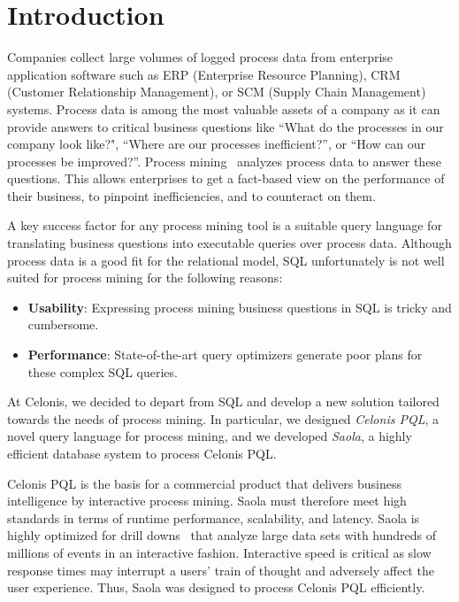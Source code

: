 \section{Introduction}
\label{sec:introduction} 

Companies collect large volumes of logged process data from enterprise application software
such as ERP (Enterprise Resource Planning), CRM (Customer Relationship Management),
or SCM (Supply Chain Management) systems. Process data is among the most
valuable assets of a company as it can provide answers to critical business
questions like ``What do the processes in our company look like?", ``Where are
our processes inefficient?'', or ``How can our processes be improved?''. Process
mining~\cite{process-mining} analyzes process data to answer these questions.
This allows enterprises to get a fact-based view on the performance of their
business, to pinpoint inefficiencies, and to counteract on them.

A key success factor for any process mining tool is a suitable query
language for translating business questions into executable queries over process data. 
Although process data is a good fit for the relational model, SQL unfortunately is not well suited for process mining for the following reasons:

\begin{itemize}
\item \textbf{Usability}: Expressing process mining business questions in SQL is tricky and cumbersome.
\item \textbf{Performance}: State-of-the-art query optimizers generate poor plans for these complex SQL queries.
\end{itemize}

At Celonis, we decided to depart from SQL and develop a new solution tailored
towards the needs of process mining. In particular, we designed \emph{Celonis PQL}, a novel query language for process mining, and we developed \emph{Saola}, a highly efficient database system to process Celonis PQL. 

Celonis PQL is the basis for a commercial product that delivers business
intelligence by interactive process mining. Saola must therefore meet high 
standards in terms of runtime performance, scalability, and latency. 
Saola is highly optimized for drill downs~\cite{drill-down} that
analyze large data sets with hundreds of millions of events in an interactive
fashion. Interactive speed is critical as slow response times
may interrupt a users' train of thought and adversely affect the user
experience. Thus, Saola was designed to process Celonis PQL efficiently.

